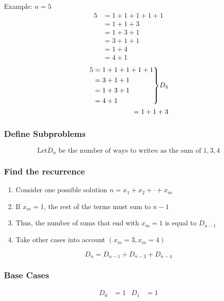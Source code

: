 \documentclass{article}
\newenvironment{rcases}
  {\left.\begin{aligned}}
  {\end{aligned}\right\rbrace}
\begin{document}
Example: \(n = 5\)
\begin{align*}
    5 & = 1+ 1 + 1 + 1 + 1 \\
      & = 1 + 1 + 3        \\
      & = 1 + 3 + 1        \\
      & = 3 + 1 + 1        \\
      & = 1 + 4            \\
      & = 4 + 1
\end{align*}
\begin{equation*}
    \begin{aligned}
        \begin{rcases}
            5 & = 1 + 1 + 1 + 1+ 1 \\
              & = 3 + 1 + 1        \\
              & = 1 + 3 + 1        \\
              & = 4 + 1            \\
        \end{rcases}  D_4 \\
        = 1 + 1 + 3
    \end{aligned}
\end{equation*}


\subsubsection*{Define Subproblems}
\begin{equation*}
    \text{Let} D_n \text{ be the number of ways to write} n \text{ as the sum of } 1, 3, 4
\end{equation*}

\subsubsection*{Find the recurrence}
\begin{enumerate}
    \item Consider one possible solution \(n = x_1 + x_2 + \cdot + x_m\)
    \item If \(x_m = 1\), the rest of the terms must sum to \(n - 1\)
    \item Thus, the number of sums that end with \(x_m = 1\) is equal to \(D_{n-1}\)
    \item Take other cases into account \((x_m = 3, x_m = 4)\)
\end{enumerate}

\begin{equation*}
    D_n = D_{n-1} + D_{n-3} + D_{n-4}
\end{equation*}

\subsubsection*{Base Cases}
\begin{align*}
    D_0 & = 1 & D_1 & = 1
\end{align*}
\end{document}
